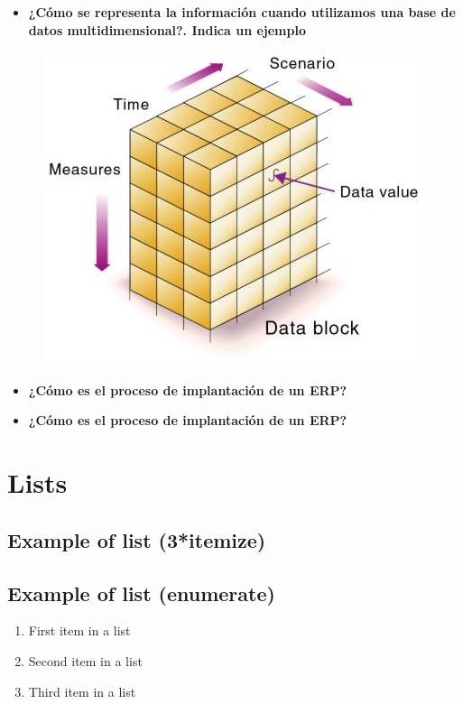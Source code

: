 \documentclass[paper=a4, fontsize=11pt]{scrartcl} %
\begin{document}
\begin{itemize}
\item \textbf{¿Cómo se representa la información cuando utilizamos una base de datos multidimensional?. Indica un ejemplo}
\end{itemize}

\begin{figure}
\centering
\includegraphics{cubo}
\end{figure}

\begin{itemize}
\item \textbf{¿Cómo es el proceso de implantación de un ERP?}
\end{itemize}

\begin{itemize}
\item \textbf{¿Cómo es el proceso de implantación de un ERP?}
\end{itemize}




\section{Lists}


\subsection{Example of list (3*itemize)}


\subsection{Example of list (enumerate)}
\begin{enumerate}
\item First item in a list 
\item Second item in a list 
\item Third item in a list
\end{enumerate}

\end{document}
